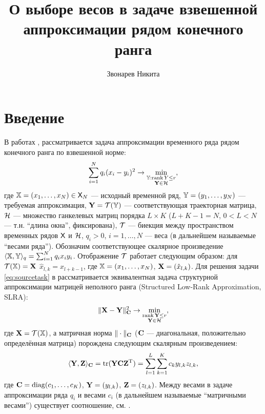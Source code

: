 \documentclass[10pt]{article}
\author{Звонарев Никита}
\title{О выборе весов в задаче взвешенной аппроксимации рядом конечного ранга}
\DeclareMathOperator{\tr}{tr}
\def\rank{\mathop{\mathrm{rank}}}
\begin{document}
\maketitle

\section*{Введение}
В работах \cite{Zvonarev2015}, \cite{Gillard2014} рассматривается задача аппроксимации временного ряда рядом конечного ранга по взвешенной норме:
\begin{equation}\label{eq:sourcetask}
\sum_{i = 1}^N q_i (x_i - y_i)^2 \to \min_{\substack{\tsY: \rank Y \le r \\ \bfY \in \calH}},
\end{equation}
где $\mathbb{X} = (x_1, \ldots, x_N) \in \mathsf{X}_N$ --- исходный временной ряд, $\mathbb{Y} = (y_1, \ldots, y_N)$ --- требуемая аппроксимация, $\mathbf{Y} = \mathcal{T}(\mathbb{Y})$ --- соответствующая траекторная матрица, $\mathcal{H}$ --- множество ганкелевых матриц порядка $L \times K$ ($L + K - 1 = N$, $0 < L < N$ --- т.н. ``длина окна'', фиксирована), $\mathcal{T}$ --- биекция между пространством временных рядов $\mathsf{X}$ и $\mathcal{H}$, $q_i > 0$, $i = 1, \ldots, N$ --- веса (в дальнейшем называемые ``весами ряда''). Обозначим соответствующее скалярное произведение $\langle \mathbb{X}, \mathbb{Y} \rangle_q = \sum_{i=1}^N q_i x_i y_i$. Отображение $\mathcal{T}$ работает следующим образом: для $\mathcal{T}(\mathbb{X}) = \mathbf{X}$ $\hat x_{l, k} = x_{l + k - 1}$, где $\mathbb{X} = (x_1, \ldots, x_N)$, $\mathbf{X} = (\hat x_{l, k})$. Для решения задачи \eqref{eq:sourcetask} в \cite{Zvonarev2015} рассматривается эквивалентная задача структурной аппроксимации матрицей неполного ранга (Structured Low-Rank Approximation, SLRA):
\begin{equation*}
	\|\bfX - \bfY\|^2_\bfC \to \min_{\substack{\rank \bfY \le r \\ \bfY \in \calH}},
\end{equation*}
где $\mathbf{X} = \mathcal{T}(\mathbb{X})$, а матричная норма $\|\cdot\|_{\mathbf{C}}$ ($\mathbf{C}$ --- диагональная, положительно определённая матрица) порождена следующим скалярным произведением:
\begin{equation*}
\langle \bfY, \bfZ \rangle_\bfC = \tr(\bfY \bfC \bfZ^\rmT) = \sum_{l=1}^L \sum_{k=1}^K c_k y_{l,k} z_{l, k},
\end{equation*}
где $\mathbf{C} = \mathop{\mathrm{diag}}(c_1, \ldots, c_K)$, $\mathbf{Y} = (y_{l, k})$, $\mathbf{Z} = (z_{l, k})$. Между весами в задаче аппроксимации ряда $q_i$ и весами $c_i$ (в дальнейшем называемые ``матричными весами'') существует соотношение, см. \cite[Proposition 4]{Zvonarev2015}.
\end{document}
